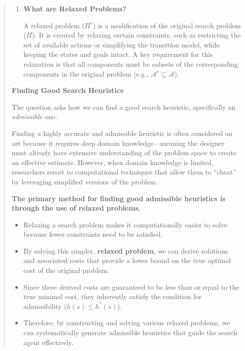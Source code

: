 \begin{quote}
\begin{enumerate}
        \item \textbf{What are Relaxed Problems?}

              A relaxed problem ($\Pi^r$) is a modification of the original search problem ($\Pi$). It is created by relaxing certain constraints, such as restricting the set of available actions or simplifying the transition model, while keeping the states and goals intact. A key requirement for this relaxation is that all components must be subsets of the corresponding components in the original problem (e.g., $\mathcal{A}^r \subseteq \mathcal{A}$).

    \end{enumerate}

    \medskip

    \noindent\textbf{Finding Good Search Heuristics}

    The question asks how we can find a good search heuristic, specifically an \emph{admissible} one.

    Finding a highly accurate and admissible heuristic is often considered an art because it requires deep domain knowledge---meaning the designer must already have extensive understanding of the problem space to create an effective estimate. However, when domain knowledge is limited, researchers resort to computational techniques that allow them to ``cheat'' by leveraging simplified versions of the problem.

    \medskip

    \noindent\textbf{The primary method for finding good admissible heuristics is through the use of relaxed problems.}

    \begin{itemize}
        \item Relaxing a search problem makes it computationally easier to solve because fewer constraints need to be satisfied.
        \item By solving this simpler, \textbf{relaxed problem}, we can derive solutions and associated costs that provide a lower bound on the true optimal cost of the original problem.
        \item Since these derived costs are guaranteed to be less than or equal to the true minimal cost, they inherently satisfy the condition for admissibility ($h(s) \le h^*(s)$).
        \item Therefore, by constructing and solving various relaxed problems, we can systematically generate admissible heuristics that guide the search agent effectively.
    \end{itemize}
\end{quote}
